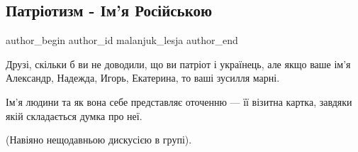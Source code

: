  
 
 
 
 
 
\subsection{Патріотизм - Ім'я Російською}
\label{sec:12_10_2019.fb.malanjuk_lesja.1.patriotizm_imja_jazyk}
 
\ifcmt
 author_begin
   author_id malanjuk_lesja
 author_end
\fi

Друзі, скільки б ви не доводили, що ви патріот і українець, але якщо ваше ім'я
Александр, Надежда, Игорь, Екатерина, то ваші зусилля марні.

Ім'я людини та як вона себе представляє оточенню — її візитна картка, завдяки
якій складається думка про неї.

(Навіяно нещодавньою дискусією в групі).

